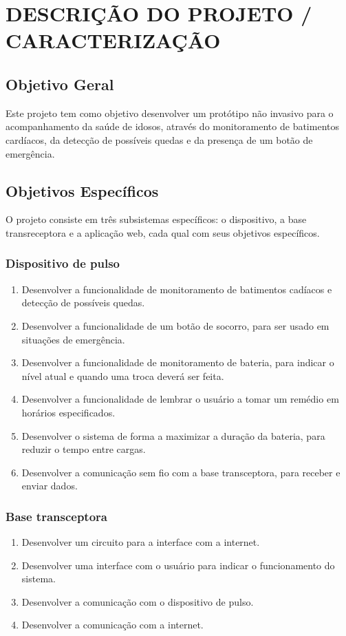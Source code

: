 \documentclass[a4paper]{article}
\begin{document}
\section{DESCRIÇÃO DO PROJETO / CARACTERIZAÇÃO}

\subsection{Objetivo Geral}
Este projeto tem como objetivo desenvolver um protótipo não invasivo para o acompanhamento da saúde de idosos, através do monitoramento de batimentos cardíacos, da detecção de possíveis quedas e da presença de um botão de emergência.

\subsection{Objetivos Específicos}
O projeto consiste em três subsistemas específicos: o dispositivo, a base transreceptora e a aplicação web, cada qual com seus objetivos específicos.

\subsubsection{Dispositivo de pulso}
\begin{enumerate}
\item Desenvolver a funcionalidade de monitoramento de batimentos cadíacos e detecção de possíveis quedas.
\item Desenvolver a funcionalidade de um botão de socorro, para ser usado em situações de emergência.
\item Desenvolver a funcionalidade de monitoramento de bateria, para indicar o nível atual e quando uma troca deverá ser feita.
\item Desenvolver a funcionalidade de lembrar o usuário a tomar um remédio em horários especificados.
\item Desenvolver o sistema de forma a maximizar a duração da bateria, para reduzir o tempo entre cargas.
\item Desenvolver a comunicação sem fio com a base transceptora, para receber e enviar dados. 
\end{enumerate}

\subsubsection{Base transceptora}
\begin{enumerate}
\item Desenvolver um circuito para a interface com a internet.
\item Desenvolver uma interface com o usuário para indicar o funcionamento do sistema.
\item Desenvolver a comunicação com o dispositivo de pulso.
\item Desenvolver a comunicação com a internet.
\end{enumerate}
\end{document}
